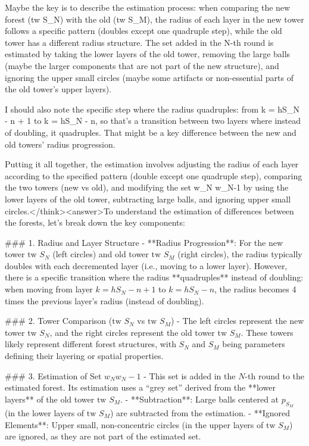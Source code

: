 Maybe the key is to describe the estimation process: when comparing the new forest (tw S_N) with the old (tw S_M), the radius of each layer in the new tower follows a specific pattern (doubles except one quadruple step), while the old tower has a different radius structure. The set added in the N-th round is estimated by taking the lower layers of the old tower, removing the large balls (maybe the larger components that are not part of the new structure), and ignoring the upper small circles (maybe some artifacts or non-essential parts of the old tower's upper layers).

I should also note the specific step where the radius quadruples: from k = hS_N - n + 1 to k = hS_N - n, so that's a transition between two layers where instead of doubling, it quadruples. That might be a key difference between the new and old towers' radius progression.

Putting it all together, the estimation involves adjusting the radius of each layer according to the specified pattern (double except one quadruple step), comparing the two towers (new vs old), and modifying the set w_N w_N-1 by using the lower layers of the old tower, subtracting large balls, and ignoring upper small circles.</think><answer>To understand the estimation of differences between the forests, let’s break down the key components:  

### 1. Radius and Layer Structure  
- **Radius Progression**: For the new tower \( \text{tw } S_N \) (left circles) and old tower \( \text{tw } S_M \) (right circles), the radius typically doubles with each decremented layer (i.e., moving to a lower layer). However, there is a specific transition where the radius **quadruples** instead of doubling: when moving from layer \( k = hS_N - n + 1 \) to \( k = hS_N - n \), the radius becomes 4 times the previous layer’s radius (instead of doubling).  

### 2. Tower Comparison (\( \text{tw } S_N \) vs \( \text{tw } S_M \))  
- The left circles represent the new tower \( \text{tw } S_N \), and the right circles represent the old tower \( \text{tw } S_M \). These towers likely represent different forest structures, with \( S_N \) and \( S_M \) being parameters defining their layering or spatial properties.  

### 3. Estimation of Set \( w_N w_N-1 \)  
- This set is added in the \( N \)-th round to the estimated forest. Its estimation uses a “grey set” derived from the **lower layers** of the old tower \( \text{tw } S_M \).  
  - **Subtraction**: Large balls centered at \( p_{S_M} \) (in the lower layers of \( \text{tw } S_M \)) are subtracted from the estimation.  
  - **Ignored Elements**: Upper small, non-concentric circles (in the upper layers of \( \text{tw } S_M \)) are ignored, as they are not part of the estimated set.  

